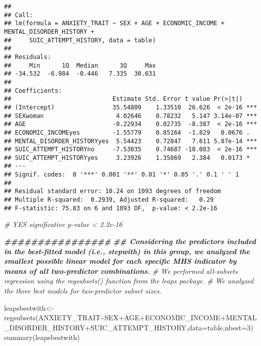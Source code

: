 \documentclass[
]{book}
\newenvironment{Shaded}{\begin{snugshade}}{\end{snugshade}}
\newcommand{\AttributeTok}[1]{\textcolor[rgb]{0.77,0.63,0.00}{#1}}
\newcommand{\CommentTok}[1]{\textcolor[rgb]{0.56,0.35,0.01}{\textit{#1}}}
\newcommand{\DecValTok}[1]{\textcolor[rgb]{0.00,0.00,0.81}{#1}}
\newcommand{\DocumentationTok}[1]{\textcolor[rgb]{0.56,0.35,0.01}{\textbf{\textit{#1}}}}
\newcommand{\FunctionTok}[1]{\textcolor[rgb]{0.00,0.00,0.00}{#1}}
\newcommand{\NormalTok}[1]{#1}
\newcommand{\OtherTok}[1]{\textcolor[rgb]{0.56,0.35,0.01}{#1}}
\newcommand{\SpecialCharTok}[1]{\textcolor[rgb]{0.00,0.00,0.00}{#1}}
\begin{document}
\begin{verbatim}
## 
## Call:
## lm(formula = ANXIETY_TRAIT ~ SEX + AGE + ECONOMIC_INCOME + MENTAL_DISORDER_HISTORY + 
##     SUIC_ATTEMPT_HISTORY, data = table)
## 
## Residuals:
##     Min      1Q  Median      3Q     Max 
## -34.532  -6.984  -0.446   7.335  30.631 
## 
## Coefficients:
##                            Estimate Std. Error t value Pr(>|t|)    
## (Intercept)                35.54809    1.33510  26.626  < 2e-16 ***
## SEXwoman                    4.02646    0.78232   5.147 3.14e-07 ***
## AGE                        -0.22934    0.02735  -8.387  < 2e-16 ***
## ECONOMIC_INCOMEyes         -1.55779    0.85164  -1.829   0.0676 .  
## MENTAL_DISORDER_HISTORYyes  5.54423    0.72847   7.611 5.87e-14 ***
## SUIC_ATTEMPT_HISTORYno     -7.53035    0.74687 -10.083  < 2e-16 ***
## SUIC_ATTEMPT_HISTORYyes     3.23926    1.35869   2.384   0.0173 *  
## ---
## Signif. codes:  0 '***' 0.001 '**' 0.01 '*' 0.05 '.' 0.1 ' ' 1
## 
## Residual standard error: 10.24 on 1093 degrees of freedom
## Multiple R-squared:  0.2939, Adjusted R-squared:   0.29 
## F-statistic: 75.83 on 6 and 1093 DF,  p-value: < 2.2e-16
\end{verbatim}

\begin{Shaded}
\begin{Highlighting}[]
\CommentTok{\# YES significative p{-}value \textless{} 2.2e{-}16}




\DocumentationTok{\#\#\#\#\#\#\#\#\#\#\#\#\#\#\#\#}
\DocumentationTok{\#\# Considering the predictors included in the best{-}fitted model (i.e., stepwith) in this group, we analyzed the smallest possible linear model for each specific MHS indicator by means of all two{-}predictor combinations.  }
\CommentTok{\# We performed all{-}subsets regression using the regsubsets() function from the leaps package.}
\CommentTok{\# We analyzed the three best models for two{-}predictor subset sizes.}

\NormalTok{leapsbestwith}\OtherTok{\textless{}{-}}\FunctionTok{regsubsets}\NormalTok{(ANXIETY\_TRAIT}\SpecialCharTok{\textasciitilde{}}\NormalTok{SEX}\SpecialCharTok{+}\NormalTok{AGE}\SpecialCharTok{+}\NormalTok{ECONOMIC\_INCOME}\SpecialCharTok{+}\NormalTok{MENTAL\_DISORDER\_HISTORY}\SpecialCharTok{+}\NormalTok{SUIC\_ATTEMPT\_HISTORY,}\AttributeTok{data=}\NormalTok{table,}\AttributeTok{nbest=}\DecValTok{3}\NormalTok{)}
\FunctionTok{summary}\NormalTok{(leapsbestwith)}
\end{Highlighting}
\end{Shaded}
\end{document}
